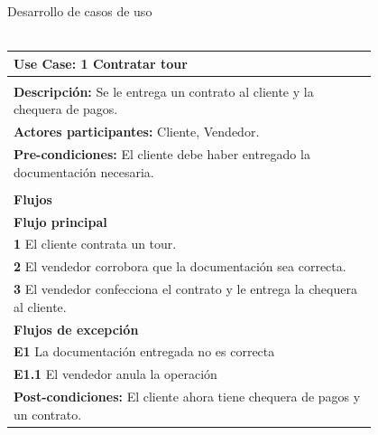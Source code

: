 \documentclass[12pt,a4paper,titlepage,oneside]{article}
\begin{document}
Desarrollo de casos de uso
\\\

\begin{tabular}{| l | p{0.8\linewidth} |} \hline
	\multicolumn{2}{|p{0.8\linewidth}|}{\textbf{Use Case:} 1 Contratar tour} \\ \hline
	\multicolumn{2}{|c|}{} \\ \hline
	\multicolumn{2}{|p{0.8\linewidth}|}{\textbf{Descripci\'on:} Se le entrega un contrato al cliente y  la chequera de pagos.} \\ \hline
	\multicolumn{2}{|p{0.8\linewidth}|}{\textbf{Actores participantes:} Cliente, Vendedor.} \\ \hline
	\multicolumn{2}{|p{0.8\linewidth}|}{\textbf{Pre-condiciones:} El cliente debe haber entregado la documentación necesaria.} \\ \hline
	\multicolumn{2}{|c|}{} \\ \hline
	\multicolumn{2}{|p{0.8\linewidth}|}{\textbf{Flujos}} \\ \hline
	\multicolumn{2}{|p{0.8\linewidth}|}{\textbf{Flujo principal}} \\ \hline
	\multicolumn{2}{|p{0.8\linewidth}|}{\textbf{1} El cliente contrata un tour.} \\ \hline
	\multicolumn{2}{|p{0.8\linewidth}|}{\textbf{2} El vendedor corrobora que la documentación sea correcta.} \\ \hline
	\multicolumn{2}{|p{0.8\linewidth}|}{\textbf{3} El vendedor confecciona el contrato y le entrega la chequera al	cliente.} \\ \hline
	\multicolumn{2}{|p{0.8\linewidth}|}{\textbf{Flujos de excepci\'on}} \\ \hline
	\multicolumn{2}{|p{0.8\linewidth}|}{\textbf{E1} La documentación entregada no es correcta} \\ \hline
	\multicolumn{2}{|p{0.8\linewidth}|}{\textbf{E1.1} El vendedor anula la operación} \\ \hline
	\multicolumn{2}{|p{0.8\linewidth}|}{\textbf{Post-condiciones:} El cliente ahora tiene chequera de pagos y un contrato.}\\ \hline
\end{tabular} \\\\
 \\\\
\end{document}
